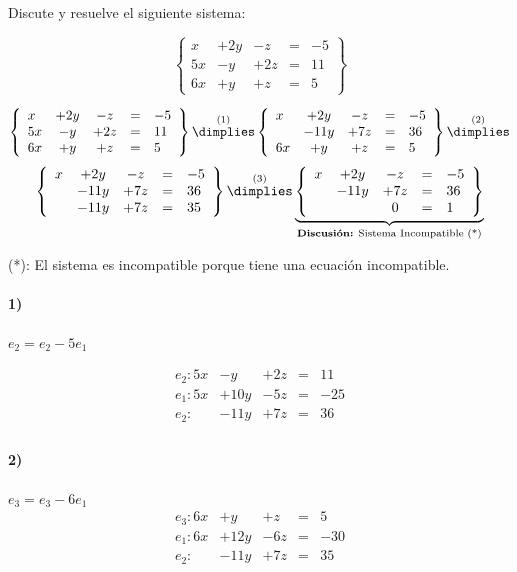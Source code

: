 \documentclass[palatino,nosec,nochap]{Docencia}
\begin{document}
\newpage
\begin{problem}

Discute y resuelve el siguiente sistema:

\[
\left\{\begin{array}{lcccl}
x&+2y&-z&=&-5\\
5x&-y&+2z&=&11\\
6x&+y&+z&=&5
\end{array}\right\}
\]

\solution

\[
\left\{\begin{array}{lcccl}
x&+2y&-z&=&-5\\
5x&-y&+2z&=&11\\
6x&+y&+z&=&5
\end{array}\right\}
\overset{(1)}{\dimplies}
\left\{\begin{array}{lcccl}
x&+2y&-z&=&-5\\
&-11y&+7z&=&36\\
6x&+y&+z&=&5
\end{array}\right\}
\overset{(2)}{\dimplies}\]
\[
\left\{\begin{array}{lcccl}
x&+2y&-z&=&-5\\
&-11y&+7z&=&36\\
& -11y&+7z&=&35
\end{array}\right\}
\overset{(3)}{\dimplies}
\underbrace{\left\{\begin{array}{lcccl}
x&+2y&-z&=&-5\\
&-11y&+7z&=&36\\
& &0&=&1
\end{array}\right\}}_{\text{\textbf{Discusión:} Sistema Incompatible (*)}}
\]

(*): El sistema es incompatible porque tiene una ecuación incompatible.


\paragraph{1)} $e_2 = e_2-5e_1$

\[
\begin{array}{lcccl}
e_2: 5x&-y&+2z&=&11\\
e_1: 5x&+10y&-5z&=&-25\\
\hline
e_2:   & -11y&+7z&=&36\\
\end{array}
\]	

\paragraph*{2)} $e_3 = e_3-6e_1$
\[
\begin{array}{lcccl}
e_3: 6x&+y&+z&=&5\\
e_1: 6x&+12y&-6z&=&-30\\
\hline
e_2:   & -11y&+7z&=&35\\
\end{array}
\]	


\end{problem}
\end{document}
